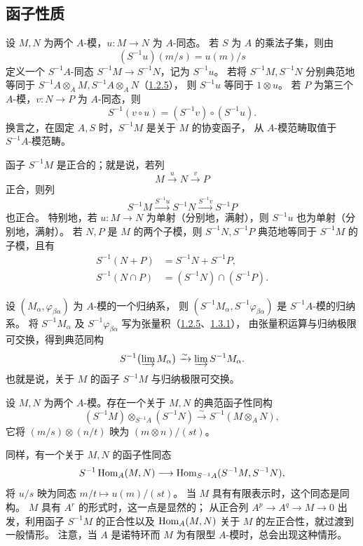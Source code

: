 \subsection{函子性质}\hypertarget{heading:0:1.3}{}

设 $M,N$ 为两个 $A$-模，$u\colon M\to N$ 为 $A$-同态。
若 $S$ 为 $A$ 的乘法子集，则由
\[
 (S^{-1}u)(m/s)=u(m)/s
\]
定义一个 $S^{-1}A$-同态 $S^{-1}M\to S^{-1}N$，记为 $S^{-1}u$。
若将 $S^{-1}M,S^{-1}N$ 分别典范地等同于 $S^{-1}A\otimes_A M,S^{-1}A\otimes_A N$（\hyperlink{para:0:1.2.5}{1.2.5}），
则 $S^{-1}u$ 等同于 $1\otimes u$。
若 $P$ 为第三个 $A$-模，$v\colon N\to P$ 为 $A$-同态，则
\[
 S^{-1}(v\circ u)=(S^{-1}v)\circ(S^{-1}u).
\]
换言之，在固定 $A,S$ 时，$S^{-1}M$ 是关于 $M$ 的协变函子，
从 $A$-模范畴取值于 $S^{-1}A$-模范畴。

函子 $S^{-1}M$ 是正合的；就是说，若列
\[
 M\xrightarrow{u}N\xrightarrow{v}P
\]
正合，则列
\[
 S^{-1}M\xrightarrow{S^{-1}u}S^{-1}N\xrightarrow{S^{-1}v}S^{-1}P
\]
也正合。
特别地，若 $u\colon M\to N$ 为单射（分别地，满射），则 $S^{-1}u$ 也为单射（分别地，满射）。
若 $N,P$ 是 $M$ 的两个子模，则 $S^{-1}N,S^{-1}P$ 典范地等同于 $S^{-1}M$ 的子模，且有
\[
 \begin{aligned}
 S^{-1}(N+P)&=S^{-1}N+S^{-1}P,\\
 S^{-1}(N\cap P)&=(S^{-1}N)\cap(S^{-1}P).
 \end{aligned}
\]

设 $(M_\alpha,\varphi_{\beta\alpha})$ 为 $A$-模的一个归纳系，
则 $(S^{-1}M_\alpha,S^{-1}\varphi_{\beta\alpha})$ 是 $S^{-1}A$-模的归纳系。
将 $S^{-1}M_\alpha$ 及 $S^{-1}\varphi_{\beta\alpha}$ 写为张量积（\hyperlink{para:0:1.2.5}{1.2.5}、\hyperlink{para:0:1.3.1}{1.3.1}），
由张量积运算与归纳极限可交换，得到典范同构
\[
 S^{-1}\bigl(\varinjlim M_\alpha\bigr)\xrightarrow{\sim}\varinjlim S^{-1}M_\alpha.
\]
也就是说，关于 $M$ 的函子 $S^{-1}M$ 与归纳极限可交换。

设 $M,N$ 为两个 $A$-模。存在一个关于 $M,N$ 的典范函子性同构
\[
 (S^{-1}M)\otimes_{S^{-1}A}(S^{-1}N)
 \xrightarrow{\sim}S^{-1}(M\otimes_A N),
\]
它将 $(m/s)\otimes(n/t)$ 映为 $(m\otimes n)/(st)$。

同样，有一个关于 $M,N$ 的函子性同态
\[
 S^{-1}\operatorname{Hom}_A(M,N)\longrightarrow
 \operatorname{Hom}_{S^{-1}A}(S^{-1}M,S^{-1}N),
\]
将 $u/s$ 映为同态 $m/t\mapsto u(m)/(st)$。
当 $M$ 具有有限表示时，这个同态是同构。
$M$ 具有 $A^r$ 的形式时，这一点是显然的；
从正合列 $A^p\to A^q\to M\to0$ 出发，利用函子 $S^{-1}M$ 的正合性以及
$\operatorname{Hom}_A(M,N)$ 关于 $M$ 的左正合性，就过渡到一般情形。
注意，当 $A$ 是诺特环而 $M$ 为有限型 $A$-模时，总会出现这种情形。

